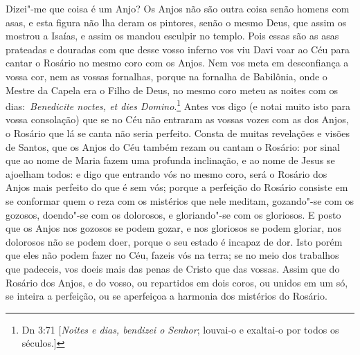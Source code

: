 Dizei"-me que coisa é um Anjo? Os Anjos não são outra coisa
senão homens com asas, e esta figura não lha deram os pintores, senão o
mesmo Deus, que assim os mostrou a Isaías, e assim os mandou esculpir no
templo. Pois essas são as asas prateadas e douradas com que desse vosso
inferno vos viu Davi voar ao Céu para cantar o Rosário no mesmo coro com
os Anjos. Nem vos meta em desconfiança a vossa cor, nem as vossas
fornalhas, porque na fornalha de Babilônia, onde o Mestre da Capela era
o Filho de Deus, no mesmo coro meteu as noites com os
dias:~\emph{Benedicite noctes, et dies Domino}.\footnote{Dn 3:71 [\textit{Noites e dias, bendizei o Senhor}; louvai-o e exaltai-o por todos os séculos.]} Antes
vos digo (e notai muito isto para vossa consolação) que se no Céu não
entraram as vossas vozes com as dos Anjos, o Rosário que lá se canta não
seria perfeito. Consta de muitas revelações e visões de Santos, que os
Anjos do Céu também rezam ou cantam o Rosário: por sinal que ao nome de
Maria fazem uma profunda inclinação, e ao nome de Jesus se ajoelham
todos: e digo que entrando vós no mesmo coro, será o Rosário dos Anjos
mais perfeito do que é sem vós; porque a perfeição do Rosário consiste
em se conformar quem o reza com os mistérios que nele meditam,
gozando"-se com os gozosos, doendo"-se com os dolorosos, e gloriando"-se
com os gloriosos. E posto que os Anjos nos gozosos se podem gozar, e nos
gloriosos se podem gloriar, nos dolorosos não se podem doer, porque o
seu estado é incapaz de dor. Isto porém que eles não podem fazer no Céu,
fazeis vós na terra; se no meio dos trabalhos que padeceis, vos doeis
mais das penas de Cristo que das vossas. Assim que do Rosário dos Anjos,
e do vosso, ou repartidos em dois coros, ou unidos em um só, se inteira
a perfeição, ou se aperfeiçoa a harmonia dos mistérios do Rosário.

